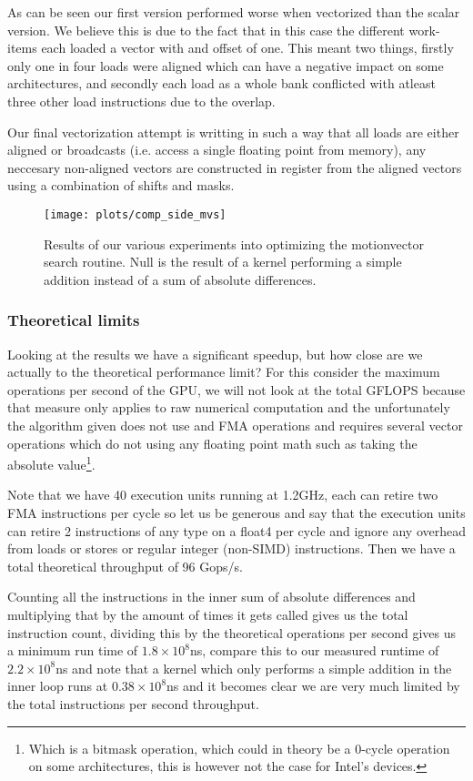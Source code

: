 \par As can be seen our first version performed worse when vectorized than the scalar version. We believe this is due to the fact that in this case the different work-items each loaded a vector with and offset of one. This meant two things,
firstly only one in four loads were aligned which can have a negative impact on some architectures, and secondly each load as a whole bank conflicted with atleast three other load instructions due to the overlap.
\par Our final vectorization attempt is writting in such a way that all loads are either aligned or broadcasts (i.e. access a single floating point from memory), any neccesary non-aligned vectors are constructed in register from the aligned vectors
using a combination of shifts and masks.

\begin{figure}
  \centering
  \texttt{[image: plots/comp\_side\_mvs]}
  \caption{Results of our various experiments into optimizing the motionvector search routine. Null is the result of a kernel performing a simple addition instead of a sum of absolute differences.}
  \label{fig:mvs}
\end{figure}

\subsubsection{Theoretical limits}
Looking at the results we have a significant speedup, but how close are we actually to the theoretical performance limit? For this consider the maximum operations per second of the GPU,
we will not look at the total GFLOPS because that measure only applies to raw numerical computation and the unfortunately the algorithm given does not use and FMA operations and requires several vector operations which do not
using any floating point math such as taking the absolute value\footnote{Which is a bitmask operation, which could in theory be a 0-cycle operation on some architectures, this is however not the case for Intel's devices.}.
\par Note that we have 40 execution units running at 1.2GHz, each can retire two FMA instructions per cycle so let us be generous and say that the execution units can retire 2 instructions of any type on a float4 per cycle and ignore any overhead from loads or stores
or regular integer (non-SIMD) instructions. Then we have a total theoretical throughput of 96 Gops/s.
\par Counting all the instructions in the inner sum of absolute differences and multiplying that by the amount of times it gets called gives us the total instruction count, dividing this by
the theoretical operations per second gives us a minimum run time of $1.8\times10^8$ns, compare this to our  measured runtime of $2.2\times10^8$ns and note that a kernel which only performs a simple addition in the inner loop runs at
$0.38\times10^8$ns and it becomes clear we are very much limited by the total instructions per second throughput.

